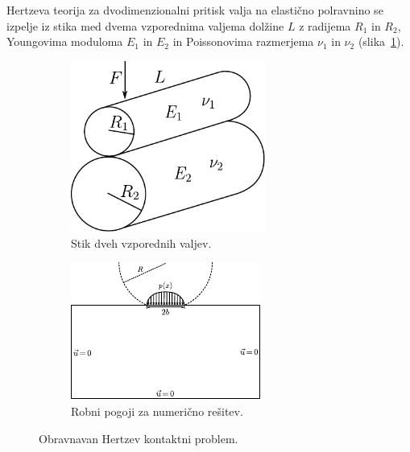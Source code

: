 \documentclass[12pt,a4paper,twoside]{article}
\theoremstyle{definition} %
\theoremstyle{plain} %
\numberwithin{equation}{section}
\begin{document}
Hertzeva teorija za dvodimenzionalni pritisk valja na elastično polravnino se izpelje iz stika med
dvema vzporednima valjema dolžine $L$ z radijema $R_1$ in $R_2$, Youngovima moduloma $E_1$ in $E_2$
in Poissonovima razmerjema $\nu_1$ in $\nu_2$ (slika~\ref{fig:hetzian-two-cylinders}).

\begin{figure}[!h]
  \centering
  \begin{subfigure}[t]{0.40\textwidth}
    \includegraphics[width=0.7\textwidth]{images/hertzian_two_cylinders.pdf}
    \caption{Stik dveh vzporednih valjev.}
    \label{fig:hetzian-two-cylinders}
  \end{subfigure}
  \begin{subfigure}[t]{0.50\textwidth}
    \includegraphics[width=\textwidth]{images/hertzian_analytical_setup.pdf}
    \caption{Robni pogoji za numerično rešitev.}
    \label{fig:hertz-analytical-setup}
  \end{subfigure}
  \caption{Obravnavan Hertzev kontaktni problem.}
  \label{fig:hertz-skica}
\end{figure}
\end{document}
